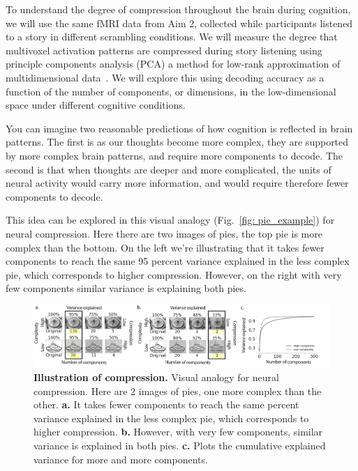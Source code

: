 \documentclass[english]{article}
\begin{document}
To understand the degree of compression throughout the brain during cognition,
we will use the same fMRI data from Aim 2, collected while participants
listened to a story in different scrambling conditions. We will measure the
degree that multivoxel activation patterns are compressed during story
listening using principle components analysis (PCA) a method for low-rank
approximation of multidimensional data~\citep{EckaYoun36}. We will explore this
using decoding accuracy as a function of the number of components, or
dimensions, in the low-dimensional space under different cognitive conditions.

You can imagine two reasonable predictions of how cognition is reflected in
brain patterns. The first is as our thoughts become more complex, they are
supported by more complex brain patterns, and require more components to
decode. The second is that when thoughts are deeper and more complicated, the
units of neural activity would carry more information, and would require
therefore fewer components to decode.


This idea can be explored in this visual analogy (Fig.~\ref{fig: pie_example})
for neural compression. Here there are two images of pies, the top pie is more
complex than the bottom. On the left we're illustrating that it takes fewer
components to reach the same 95 percent variance explained in the less complex
pie, which corresponds to higher compression. However, on the right with very
few components similar variance is explaining both pies.

\begin{figure}
  \centering
  \includegraphics[width=\textwidth]{figs/pie_example.pdf}
  \caption{\textbf{Illustration of compression.} Visual analogy for
    neural compression. Here are 2 images of pies, one more complex
    than the other. \textbf{a.} It takes fewer components to reach the same percent
    variance explained in the less complex pie, which corresponds to
    higher compression. \textbf{b.} However, with very few components, similar variance is explained in both pies.
\textbf{c.} Plots the cumulative explained variance for more and more components.}
  \label{fig:pie_example}
\end{figure}
\end{document}
